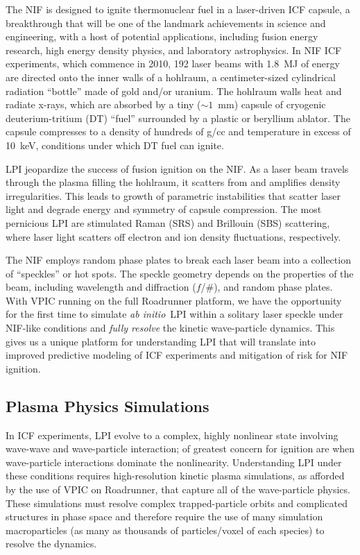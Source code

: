 \documentclass[10pt]{article}
\newcommand{\abinitio} {\textit{ab initio}}
\begin{document}
The NIF is designed to ignite thermonuclear fuel
in a laser-driven ICF capsule, a breakthrough that will be
one of the landmark achievements in science and engineering, with
a host of potential applications, including fusion energy
research, high energy density physics, and laboratory astrophysics.
In NIF ICF experiments, which commence in 2010, 192 laser beams with 
1.8~MJ of energy are directed onto the inner walls of a
hohlraum, a centimeter-sized cylindrical radiation ``bottle''
made of gold and/or uranium.  The hohlraum walls heat and radiate x-rays, 
which are absorbed by a tiny ($\sim 1$~mm) capsule of cryogenic 
deuterium-tritium (DT) ``fuel'' surrounded by a plastic or beryllium
ablator.  The capsule compresses to a density of hundreds
of g/cc and temperature in excess of 10~keV, conditions under which
DT fuel can ignite.

LPI jeopardize the success of fusion
ignition on the NIF.  As a laser beam travels through the plasma filling
the hohlraum, it scatters from and amplifies density irregularities.  
This leads to growth of parametric instabilities that scatter laser light 
and degrade energy and symmetry of capsule compression.  The most pernicious 
LPI are stimulated Raman (SRS) and Brillouin (SBS) scattering, where laser 
light scatters off electron and ion density fluctuations, respectively.

The NIF employs random phase plates to break each laser beam
into a collection of ``speckles'' or hot spots.  The
speckle geometry depends on the properties of the beam,
including wavelength and diffraction ($f$/\#), and random phase plates.  
With VPIC running on the full Roadrunner platform, we have the
opportunity for the first time to simulate \abinitio\ LPI within a
solitary laser speckle under NIF-like conditions and \textit{fully resolve} 
the kinetic wave-particle dynamics.  This gives us a
unique platform for understanding LPI that will translate into
improved predictive modeling of ICF experiments and mitigation of risk
for NIF ignition.

%
%
\subsection*{Plasma Physics Simulations}


In ICF experiments, LPI evolve to a complex, highly nonlinear state 
involving wave-wave and wave-particle interaction; of greatest concern for
ignition are when wave-particle interactions dominate the nonlinearity.
Understanding LPI under these conditions requires high-resolution
kinetic plasma simulations, as afforded by the use of VPIC on
Roadrunner, that capture all of the wave-particle physics.  These
simulations must resolve complex trapped-particle orbits and 
complicated structures in phase space and therefore require the use 
of many simulation macroparticles (as many as thousands of particles/voxel of
each species) to resolve the dynamics.~\cite{Yin_et_al_Phys_Plasmas_2006}
\end{document}
